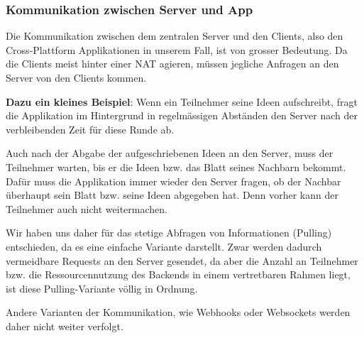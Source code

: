 \subsubsection{Kommunikation zwischen Server und App}
Die Kommunikation zwischen dem zentralen Server und den Clients, also den Cross-Plattform Applikationen in unserem Fall, ist von grosser Bedeutung. Da die Clients meist hinter einer NAT \cite{NAT} agieren, müssen jegliche Anfragen an den Server von den Clients kommen.


\textbf{Dazu ein kleines Beispiel}: Wenn ein Teilnehmer seine Ideen aufschreibt, fragt die Applikation im Hintergrund in regelmässigen Abständen den Server nach der verbleibenden Zeit für diese Runde ab.


Auch nach der Abgabe der aufgeschriebenen Ideen an den Server, muss der Teilnehmer warten, bis er die Ideen bzw. das Blatt seines Nachbarn bekommt. Dafür muss die Applikation immer wieder den Server fragen, ob der Nachbar überhaupt sein Blatt bzw. seine Ideen abgegeben hat. Denn vorher kann der Teilnehmer auch nicht weitermachen.


Wir haben uns daher für das stetige Abfragen von Informationen (Pulling) entschieden, da es eine einfache Variante darstellt. Zwar werden dadurch vermeidbare Requests an den Server gesendet, da aber die Anzahl an Teilnehmer bzw. die Ressourcennutzung des Backends in einem vertretbaren Rahmen liegt, ist diese Pulling-Variante völlig in Ordnung.  


Andere Varianten der Kommunikation, wie Webhooks oder Websockets werden daher nicht weiter verfolgt.